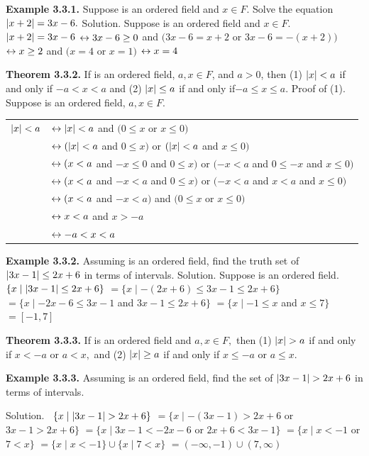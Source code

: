 \begin{large}
\textbf{Example 3.3.1.} Suppose \of is an ordered field and $x\in F.$ Solve the equation $\left|x + 2\right|=3x - 6.$\nl
Solution. Suppose \of is an ordered field and $x\in F.$ \nl
$\left|x + 2\right| = 3x - 6$\nl
$\leftrightarrow 3x-6 \geq 0$ and $(3x - 6 = x + 2$ or $3x - 6 = -(x+ 2))$\nl
$\leftrightarrow x\geq 2$ and $(x=4$ or $x=1)$\nl
$\leftrightarrow x=4$\nl

\textbf{Theorem 3.3.2.} If \of is an ordered field, $a,x\in F$, and $a > 0$, then
(1) $\left|x\right| < a$ if and only if $-a < x < a$\nl
and\nl
(2) $\left|x\right|\leq a$ if and only if$ -a \leq x \leq a.$\nl
Proof of (1). Suppose \of is an ordered field, $a,x\in F.$\nl
\begin{tabular}{l l}
$\left|x\right| < a$ &$\leftrightarrow \left|x\right|<a$ and $(0 \leq x$ or $x\leq 0)$\\
&$\leftrightarrow (\left|x\right| < a$ and $0 \leq x)$ or $(\left|x\right| < a$ and $x\leq 0)$\\
&$\leftrightarrow (x < a$ and $-x\leq 0$ and $0\leq x)$ or $(-x < a$ and $0\leq -x$ and $x\leq 0)$\\
&$\leftrightarrow (x<a$ and $-x < a$ and $0\leq x)$ or $(-x<a$ and $x<a$ and $x\leq 0)$\\
&$\leftrightarrow (x < a$ and $-x < a)$ and $(0\leq x$ or $x\leq 0)$\\
&$\leftrightarrow x < a$ and $x > -a$\\
&$\leftrightarrow -a < x < a$\\
\end{tabular}\nl

\textbf{Example 3.3.2.} Assuming \of is an ordered field, find the truth set of $\left|3x - 1\right|\leq 2x + 6$ in terms of intervals. \nl
Solution. Suppose \of is an ordered field.\nl
$\{x \mid \left|3x - 1\right|\leq 2x+6\}$\nl
$=\{x \mid -(2x+6)\leq 3x-1 \leq 2x+6\}$\nl
$= \{x \mid -2x-6\leq 3x-1$ and $3x-1\leq 2x+6\}$\nl
$= \{x \mid -1\leq x$ and $x\leq 7\}$\nl
$=[-1,7] $\nl

\textbf{Theorem 3.3.3.} If \of is an ordered field and $a,x\in F,$ then \nl
(1) $\left|x\right| > a$ if and only if $x < -a$ or $a < x,$ and \nl
(2) $\left|x\right| \geq a$ if and only if  $x\leq -a$ or $a\leq x.$ \nl

\textbf{Example 3.3.3.} Assuming \of is an ordered field, find the set of $\left|3x - 1\right| > 2x + 6$ in terms of intervals. \nl

\newpage


Solution.
~$\{x\mid \left|3x - 1\right| > 2x + 6\} $\nl
$=\{x \mid -(3x-1) > 2x + 6$ or $3x - 1 > 2x + 6\}$\nl
$=\{x \mid 3x - 1  < -2x - 6$ or $2x + 6 < 3x - 1\}$ \nl
$=\{x\mid  x < - 1 $ or $7< x\}$\nl
$=\{x \mid x < -1\}\cup \{x \mid 7 < x\} $\nl
$=(-\infty,-1) \cup (7,\infty)$\nl


\end{large}
